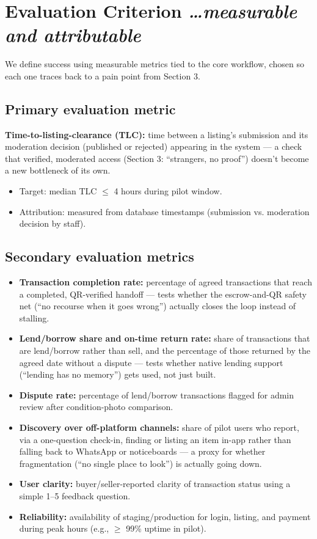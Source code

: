 \documentclass[11pt,a4paper]{article}
\newcommand{\BvrHint}[1]{%
  {\normalfont\normalsize\itshape\hfill #1}}
\begin{document}
\section{Evaluation Criterion %
\BvrHint{\ldots measurable and attributable}}
We define success using measurable metrics tied to the core workflow, chosen
so each one traces back to a pain point from Section 3.

\subsection{Primary evaluation metric}
\textbf{Time-to-listing-clearance (TLC):} time between a listing's
submission and its moderation decision (published or rejected) appearing in
the system — a check that verified, moderated access (Section 3: ``strangers,
no proof'') doesn't become a new bottleneck of its own.
\begin{itemize}[leftmargin=0.7cm]
    \item Target: median TLC $\le$ 4 hours during pilot window.
    \item Attribution: measured from database timestamps (submission vs. moderation decision by staff).
\end{itemize}

\subsection{Secondary evaluation metrics}
\begin{itemize}[leftmargin=0.7cm]
    \item \textbf{Transaction completion rate:} percentage of agreed transactions that reach a completed, QR-verified handoff — tests whether the escrow-and-QR safety net (``no recourse when it goes wrong'') actually closes the loop instead of stalling.
    \item \textbf{Lend/borrow share and on-time return rate:} share of transactions that are lend/borrow rather than sell, and the percentage of those returned by the agreed date without a dispute — tests whether native lending support (``lending has no memory'') gets used, not just built.
    \item \textbf{Dispute rate:} percentage of lend/borrow transactions flagged for admin review after condition-photo comparison.
    \item \textbf{Discovery over off-platform channels:} share of pilot users who report, via a one-question check-in, finding or listing an item in-app rather than falling back to WhatsApp or noticeboards — a proxy for whether fragmentation (``no single place to look'') is actually going down.
    \item \textbf{User clarity:} buyer/seller-reported clarity of transaction status using a simple 1--5 feedback question.
    \item \textbf{Reliability:} availability of staging/production for login, listing, and payment during peak hours (e.g., $\ge$ 99\% uptime in pilot).
\end{itemize}
\end{document}
